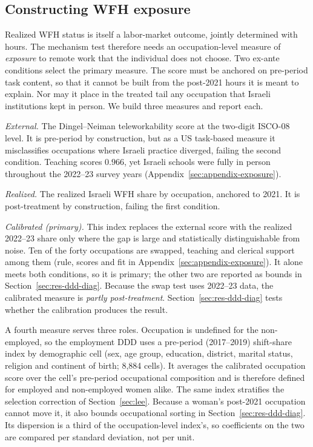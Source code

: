 \documentclass[12pt,a4paper]{article}
\begin{document}
\subsection{Constructing WFH exposure}\label{sec:exposure}

Realized WFH status is itself a labor-market outcome, jointly determined with hours. The
mechanism test therefore needs an occupation-level measure of \emph{exposure} to remote work that
the individual does not choose. Two ex-ante conditions select the primary measure. The score
must be anchored on pre-period task content, so that it cannot be built from the post-2021 hours
it is meant to explain. Nor may it place in the treated tail any occupation that Israeli
institutions kept in person. We build three measures and report each.

\noindent \emph{External.} The Dingel--Neiman teleworkability score \citep{dingel2020} at the
two-digit ISCO-08 level. It is pre-period by construction, but as a US task-based measure it
misclassifies occupations where Israeli practice diverged, failing the second condition.
Teaching scores $0.966$, yet Israeli schools were fully in person throughout the 2022--23 survey
years (Appendix~\ref{sec:appendix-exposure}).

\noindent \emph{Realized.} The realized Israeli WFH share by occupation, anchored to 2021. It is
post-treatment by construction, failing the first condition.

\noindent \emph{Calibrated (primary).} This index replaces the external score with the realized 2022--23
share only where the gap is large and statistically distinguishable from noise. Ten of the forty
occupations are swapped, teaching and clerical support among them (rule, scores and fit in
Appendix~\ref{sec:appendix-exposure}). It alone meets both conditions, so it is primary; the
other two are reported as bounds in Section~\ref{sec:res-ddd-diag}. Because the swap test uses
2022--23 data, the calibrated measure is \emph{partly post-treatment}.
Section~\ref{sec:res-ddd-diag} tests whether the calibration produces the result.

\noindent A fourth measure serves three roles. Occupation is undefined for the non-employed, so the
employment DDD uses a pre-period (2017--2019) shift-share index by demographic cell (sex, age
group, education, district, marital status, religion and continent of birth; 8,884 cells). It
averages the calibrated occupation score over the cell's pre-period occupational composition and
is therefore defined for employed and non-employed women alike. The same index stratifies the
selection correction of Section~\ref{sec:lee}. Because a woman's post-2021 occupation cannot
move it, it also bounds occupational sorting in Section~\ref{sec:res-ddd-diag}. Its dispersion
is a third of the occupation-level index's, so coefficients on the two are compared per standard
deviation, not per unit.
\end{document}
